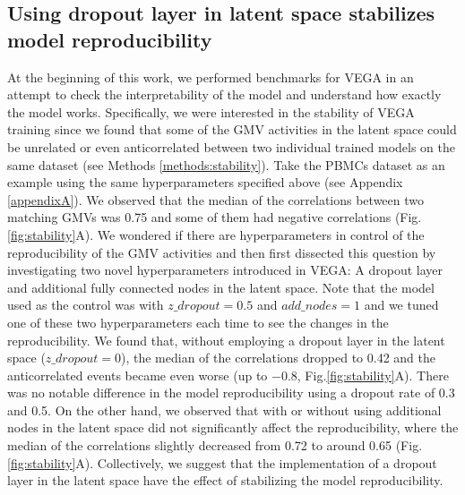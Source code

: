\subsection{Using dropout layer in latent space stabilizes model reproducibility}\label{sec:reproducibility}
At the beginning of this work, we performed benchmarks for VEGA in an attempt to check the interpretability of the model and understand how exactly the model works. Specifically, we were interested in the stability of VEGA training since we found that some of the GMV activities in the latent space could be unrelated or even anticorrelated between two individual trained models on the same dataset (see Methods \ref{methods:stability}). Take the PBMCs dataset\cite{Kang2018} as an example using the same hyperparameters specified above (see Appendix \ref{appendixA}). We observed that the median of the correlations between two matching GMVs was 0.75 and some of them had negative correlations (Fig.\ref{fig:stability}A). We wondered if there are hyperparameters in control of the reproducibility of the GMV activities and then first dissected this question by investigating two novel hyperparameters introduced in VEGA: A dropout layer and additional fully connected nodes in the latent space. Note that the model used as the control was with $z\_dropout=0.5$ and $add\_nodes=1$ and we tuned one of these two hyperparameters each time to see the changes in the reproducibility. We found that, without employing a dropout layer in the latent space ($z\_dropout=0$), the median of the correlations dropped to 0.42 and the anticorrelated events became even worse (up to $-0.8$, Fig.\ref{fig:stability}A). There was no notable difference in the model reproducibility using a dropout rate of 0.3 and 0.5. On the other hand, we observed that with or without using additional nodes in the latent space did not significantly affect the reproducibility, where the median of the correlations slightly decreased from 0.72 to around 0.65 (Fig.\ref{fig:stability}A). Collectively, we suggest that the implementation of a dropout layer in the latent space have the effect of stabilizing the model reproducibility.


